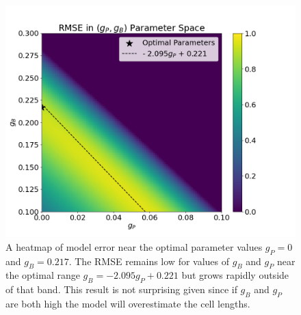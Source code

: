 \begin{figure}[!hbt]
    \centering
    \includegraphics[width=13cm]{img/growth-model-heatmap.png}
    \caption{A heatmap of model error near the optimal parameter values $g_{P} = 0$ and $g_{B} = 0.217$. The RMSE remains low for values of $g_{B}$ and $g_{P}$ near the optimal range $g_{B} = -2.095g_{P} + 0.221$ but grows rapidly outside of that band. This result is not surprising given since if $g_{B}$ and $g_{P}$ are both high the model will overestimate the cell lengths. }
    \label{fig:growth-model-heatmap}
\end{figure}




